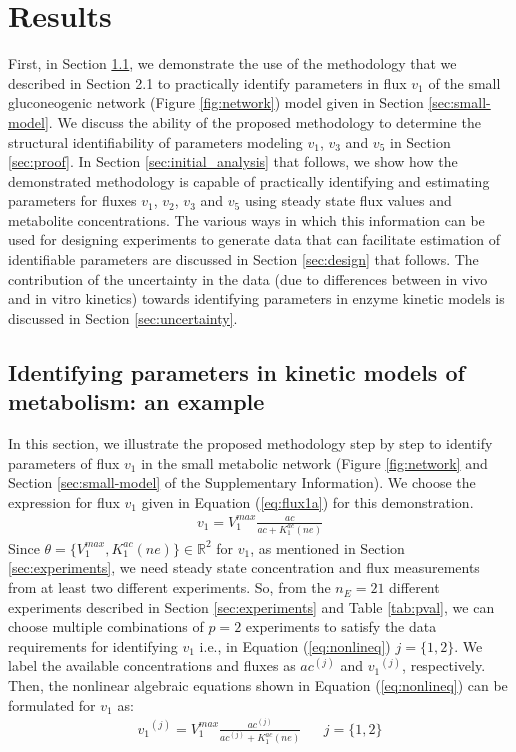 \documentclass[10pt]{article}
\begin{document}
	\section{Results}
	First, in Section \ref{sec:example}, we demonstrate the use of the methodology that we described in Section 2.1 to practically identify parameters in flux $v_1$ of the small gluconeogenic network (Figure \ref{fig:network}) model given in Section \ref{sec:small-model}. 
	We discuss the ability of the proposed methodology to determine the structural identifiability of parameters modeling $v_1$, $v_3$ and $v_5$ in Section \ref{sec:proof}. 	
	In Section \ref{sec:initial_analysis} that follows, we show how the demonstrated methodology is capable of practically identifying and estimating parameters for fluxes $v_1$, $v_2$, $v_3$ and $v_5$ using steady state flux values and metabolite concentrations. 
	The various ways in which this information can be used for designing experiments to generate data that can facilitate estimation of identifiable parameters are discussed in Section \ref{sec:design} that follows.
	The contribution of the uncertainty in the data (due to differences between in vivo and in vitro kinetics) towards identifying parameters in enzyme kinetic models is discussed in Section \ref{sec:uncertainty}.
		
	\subsection{Identifying parameters in kinetic models of metabolism: an example}\label{sec:example}	
	In this section, we illustrate the proposed methodology step by step to identify parameters of flux $v_1$ in the small metabolic network (Figure \ref{fig:network} and Section \ref{sec:small-model} of the Supplementary Information). We choose the expression for flux $v_1$ given in Equation (\ref{eq:flux1a}) for this demonstration. 
	\begin{align}\tag{S5}
	v_1 = V_1^{max}\frac{ac}{ac+K_{1}^{ac}(ne)}
	\end{align}		
	Since $\theta = \{V_1^{max}, K_1^{ac} (ne)\} \in \mathbb{R}^2$ for $v_1$, as mentioned in Section \ref{sec:experiments}, we need steady state concentration and flux measurements from at least two different experiments. So, from the $n_E = 21$ different experiments described in Section \ref{sec:experiments} and Table \ref{tab:pval}, we can choose multiple combinations of $p = 2$ experiments to satisfy the data requirements for identifying $v_1$ i.e., in Equation (\ref{eq:nonlineq}) $j = \{1, 2\}$. We label the available concentrations and fluxes as ${ac}^{(j)}$ and ${v_1}^{(j)}$, respectively. Then, the nonlinear algebraic equations shown in Equation (\ref{eq:nonlineq}) can be formulated for $v_1$ as:
	\begin{align*}%
	{v_1}^{(j)} = V_{1}^{max}\frac{ac^{(j)}}{ac^{(j)}+K_{1}^{ac}(ne)} &&  j=\{1, 2\}
	\end{align*}
	
\end{document}
